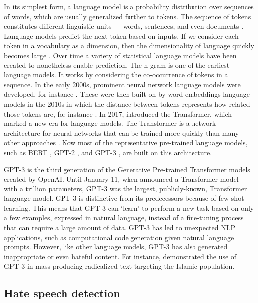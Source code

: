 \documentclass[12pt,]{article}
\begin{document}
In its simplest form, a language model is a probability distribution over sequences of words, which are usually generalized further to tokens. The sequence of tokens constitutes different linguistic units --- words, sentences, and even documents \citep{bengio2003neural}. Language models predict the next token based on inputs. If we consider each token in a vocabulary as a dimension, then the dimensionality of language quickly becomes large \citep{rosenfeld2000two}. Over time a variety of statistical language models have been created to nonetheless enable prediction. The n-gram is one of the earliest language models. It works by considering the co-occurrence of tokens in a sequence. In the early 2000s, prominent neural network language models were developed, for instance \citet{bengio2003neural}. These were then built on by word embeddings language models in the 2010s in which the distance between tokens represents how related those tokens are, for instance \citet{turian2010word}. In 2017, \citet{vaswani2017attention} introduced the Transformer, which marked a new era for language models. The Transformer is a network architecture for neural networks that can be trained more quickly than many other approaches \citep{vaswani2017attention}. Now most of the representative pre-trained language models, such as BERT \citep{devlin2018bert}, GPT-2 \citep{radford2019language}, and GPT-3 \citep{brown2020language}, are built on this architecture.

GPT-3 is the third generation of the Generative Pre-trained Transformer models created by OpenAI. Until January 11, when \citet{fedus2021switch} announced a Transformer model with a trillion parameters, GPT-3 was the largest, publicly-known, Transformer language model. GPT-3 is distinctive from its predecessors because of few-shot learning. This means that GPT-3 can `learn' to perform a new task based on only a few examples, expressed in natural language, instead of a fine-tuning process that can require a large amount of data. GPT-3 has led to unexpected NLP applications, such as computational code generation given natural language prompts. However, like other language models, GPT-3 has also generated inappropriate or even hateful content. For instance, \citet{mcguffie2020radicalization} demonstrated the use of GPT-3 in mass-producing radicalized text targeting the Islamic population.

\hypertarget{hate-speech-detection}{%
\subsection{Hate speech detection}\label{hate-speech-detection}}
\end{document}
